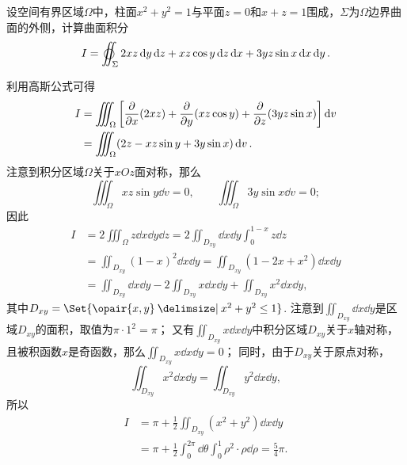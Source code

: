 \begin{example}
设空间有界区域\(\Omega\)中，柱面\(x^2+y^2=1\)与平面\(z=0\)和\(x+z=1\)围成，\(\Sigma\)为\(\Omega\)边界曲面的外侧，计算曲面积分\[
I = \varoiint_\Sigma 2xz \dd{y}\dd{z} + xz \cos y \dd{z}\dd{x} + 3yz \sin x \dd{x}\dd{y}.
\]
\begin{solution}
利用高斯公式可得
\begin{align*}
I &= \iiint_{\Omega} \left[ \pdv{x}(2xz) + \pdv{y}(xz \cos y) + \pdv{z}(3yz \sin x) \right] \dd{v} \\
&= \iiint_{\Omega} (2z - xz \sin y + 3y \sin x) \dd{v}.
\end{align*}
注意到积分区域\(\Omega\)关于\(xOz\)面对称，那么\[
\iiint_{\Omega} xz \sin y \dd{v} = 0,
\qquad
\iiint_{\Omega} 3y \sin x \dd{v} = 0;
\]因此\begin{align*}
I &= 2 \iiint_{\Omega} z \dd{x}\dd{y}\dd{z}
= 2 \iint_{D_{xy}} \dd{x}\dd{y} \int_0^{1-x} z \dd{z} \\
&= \iint_{D_{xy}} (1-x)^2 \dd{x}\dd{y}
= \iint_{D_{xy}} (1-2x+x^2) \dd{x}\dd{y} \\
&= \iint_{D_{xy}} \dd{x}\dd{y}
- 2 \iint_{D_{xy}} x \dd{x}\dd{y}
+ \iint_{D_{xy}} x^2 \dd{x}\dd{y},
\end{align*}
其中\(D_{xy} = \Set{\opair{x,y} \given x^2+y^2\leq1}\).
注意到\(\iint_{D_{xy}} \dd{x}\dd{y}\)是区域\(D_{xy}\)的面积，取值为\(\pi\cdot1^2=\pi\)；
又有\(\iint_{D_{xy}} x \dd{x}\dd{y}\)中积分区域\(D_{xy}\)关于\(x\)轴对称，且被积函数\(x\)是奇函数，那么\(\iint_{D_{xy}} x \dd{x}\dd{y} = 0\)；
同时，由于\(D_{xy}\)关于原点对称，\[
\iint_{D_{xy}} x^2 \dd{x}\dd{y} = \iint_{D_{xy}} y^2 \dd{x}\dd{y},
\]所以\begin{align*}
I &= \pi + \frac{1}{2} \iint_{D_{xy}} (x^2+y^2) \dd{x}\dd{y} \\
&= \pi + \frac{1}{2}
	\int_0^{2\pi} \dd{\theta} \int_0^1 \rho^2 \cdot \rho\dd{\rho}
= \frac{5}{4} \pi.
\end{align*}
\end{solution}
\end{example}


